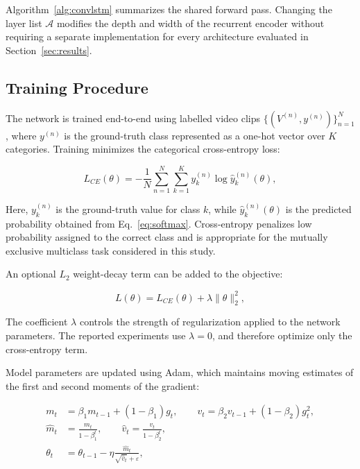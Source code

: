 \documentclass[journal,article,submit,moreauthors]{Definitions/mdpi}
\begin{document}
    Algorithm~\ref{alg:convlstm} summarizes the shared forward pass. 
    Changing the layer list $\mathcal{A}$ modifies the depth and width 
    of the recurrent encoder without requiring a separate implementation 
    for every architecture evaluated in Section~\ref{sec:results}.

    \subsection{Training Procedure}
    \label{sec:training}

    The network is trained end-to-end using labelled video clips
    $\{(V^{(n)},y^{(n)})\}_{n=1}^{N}$, where $y^{(n)}$ is the 
    ground-truth class represented as a one-hot vector over $K$ 
    categories. Training minimizes the categorical cross-entropy loss:

    \begin{equation}
        L_{CE}(\theta) = -\frac{1}{N} \sum_{n=1}^{N} 
        \sum_{k=1}^{K} y_k^{(n)} \log \hat{y}_k^{(n)}(\theta),
        \label{eq:crossentropy}
    \end{equation}

    Here, $y_k^{(n)}$ is the ground-truth value for class $k$, while
    $\hat{y}_k^{(n)}(\theta)$ is the predicted probability obtained 
    from Eq.~\eqref{eq:softmax}. Cross-entropy penalizes low 
    probability assigned to the correct class and is appropriate 
    for the mutually exclusive multiclass task considered in this study.

    An optional $L_2$ weight-decay term can be added to the objective:

    \begin{equation}
        L(\theta) = L_{CE}(\theta) + \lambda \lVert \theta \rVert_2^2,
        \label{eq:regularized}
    \end{equation}

    The coefficient $\lambda$ controls the strength of regularization 
    applied to the network parameters. The reported experiments use 
    $\lambda=0$, and therefore optimize only the cross-entropy term.

    Model parameters are updated using Adam, which maintains moving 
    estimates of the first and second moments of the gradient:

    \begin{align}
        m_t &= \beta_1 m_{t-1} + (1-\beta_1) g_t, \qquad
        v_t = \beta_2 v_{t-1} + (1-\beta_2) g_t^2, \label{eq:adam1} \\
        \hat{m}_t &= \frac{m_t}{1-\beta_1^{t}}, \qquad
        \hat{v}_t = \frac{v_t}{1-\beta_2^{t}}, \label{eq:adam2} \\
        \theta_t &= \theta_{t-1} - \eta \frac{\hat{m}_t}{\sqrt{\hat{v}_t} 
        + \varepsilon}, \label{eq:adam3}
    \end{align}
\end{document}
